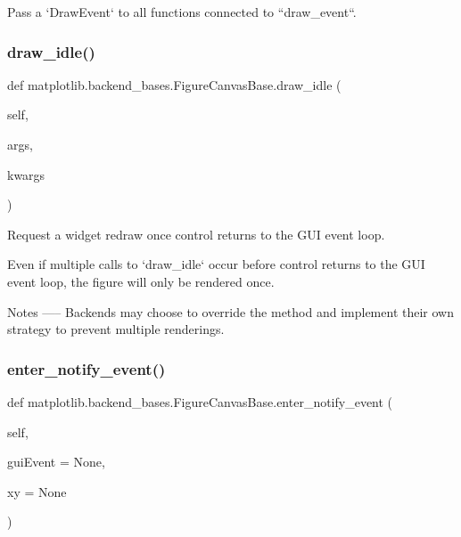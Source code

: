 \begin{DoxyVerb}Pass a `DrawEvent` to all functions connected to ``draw_event``.\end{DoxyVerb}
 \mbox{\label{classmatplotlib_1_1backend__bases_1_1FigureCanvasBase_a4b83ecf82e04e71ef9317c484c44ee04}} 
\subsubsection{\texorpdfstring{draw\+\_\+idle()}{draw\_idle()}}
{\footnotesize\ttfamily def matplotlib.\+backend\+\_\+bases.\+Figure\+Canvas\+Base.\+draw\+\_\+idle (\begin{DoxyParamCaption}\item[{}]{self,  }\item[{}]{args,  }\item[{}]{kwargs }\end{DoxyParamCaption})}

\begin{DoxyVerb}Request a widget redraw once control returns to the GUI event loop.

Even if multiple calls to `draw_idle` occur before control returns
to the GUI event loop, the figure will only be rendered once.

Notes
-----
Backends may choose to override the method and implement their own
strategy to prevent multiple renderings.\end{DoxyVerb}
 \mbox{\label{classmatplotlib_1_1backend__bases_1_1FigureCanvasBase_ab5e1531fcbba8202340737b6be399a08}} 
\subsubsection{\texorpdfstring{enter\+\_\+notify\+\_\+event()}{enter\_notify\_event()}}
{\footnotesize\ttfamily def matplotlib.\+backend\+\_\+bases.\+Figure\+Canvas\+Base.\+enter\+\_\+notify\+\_\+event (\begin{DoxyParamCaption}\item[{}]{self,  }\item[{}]{gui\+Event = {\ttfamily None},  }\item[{}]{xy = {\ttfamily None} }\end{DoxyParamCaption})}

